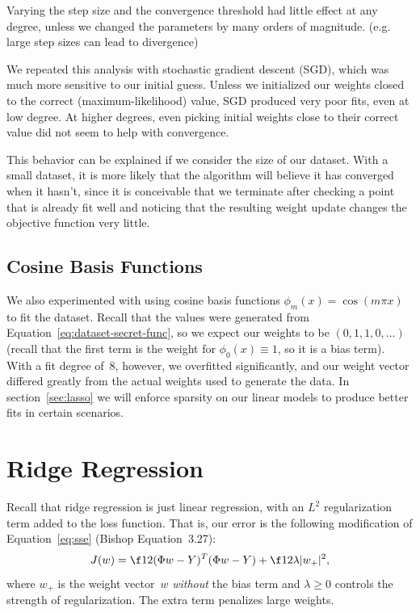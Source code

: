 \documentclass{article}
\begin{document}
\begin{multicols}{2}
Varying the step size and the convergence threshold had little effect at any degree, unless we changed the parameters by many orders of magnitude. (e.g. large step sizes can lead to divergence)

We repeated this analysis with stochastic gradient descent (SGD), which was much more sensitive to our initial guess.
Unless we initialized our weights closed to the correct (maximum-likelihood) value, SGD produced very poor fits, even at low degree.
At higher degrees, even picking initial weights close to their correct value did not seem to help with convergence.

This behavior can be explained if we consider the size of our dataset.
With a small dataset, it is more likely that the algorithm will believe it has converged when it hasn't, since it is conceivable that we terminate after checking a point that is already fit well and noticing that the resulting weight update changes the objective function very little.


\subsection{Cosine Basis Functions}
\label{subsec:cosine-basis}

We also experimented with using cosine basis functions $\phi_m(x) = \cos(m\pi x)$ to fit the dataset.
Recall that the values were generated from Equation~\ref{eq:dataset-secret-func}, so we expect our weights to be $(0, 1, 1, 0, \dots)$ (recall that the first term is the weight for $\phi_0(x) \equiv 1$, so it is a bias term).
With a fit degree of~8, however, we overfitted significantly, and our weight vector differed greatly from the actual weights used to generate the data.
In section~\ref{sec:lasso} we will enforce sparsity on our linear models to produce better fits in certain scenarios.




\section{Ridge Regression}

Recall that ridge regression is just linear regression, with an $L^2$ regularization term added to the loss function. That is, our error is the following modification of Equation~\ref{eq:sse} (Bishop Equation~3.27):
\begin{equation}\label{eq:moderr}
J(w) = \f12 (\Phi w - Y)^T (\Phi w - Y) + \f12 \lambda |w_+|^2,
\end{equation}
where $w_+$ is the weight vector~$w$ \emph{without} the bias term and $\lambda\ge 0$ controls the strength of regularization. The extra term penalizes large weights.


\end{multicols}
\end{document}
